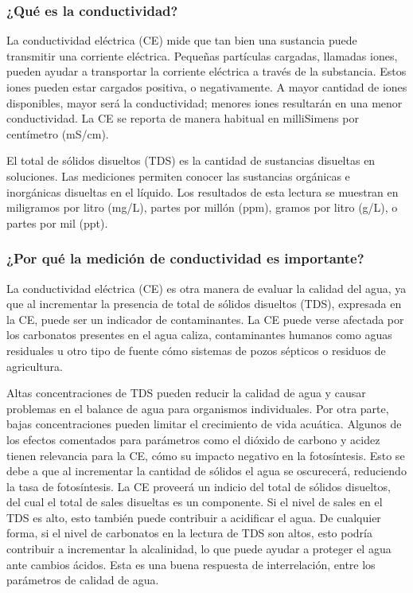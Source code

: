 \subsubsection{¿Qué es la conductividad?}
La conductividad eléctrica (CE) mide que tan bien una sustancia puede transmitir una corriente eléctrica. 
Pequeñas partículas cargadas, llamadas iones, pueden ayudar a transportar la corriente eléctrica a través de la substancia. 
Estos iones pueden estar cargados positiva, o negativamente. A mayor cantidad de iones disponibles, mayor será la conductividad; menores iones resultarán en una menor conductividad. 
La CE se reporta de manera habitual en milliSimens por centímetro (mS/cm).

El total de sólidos disueltos (TDS) es la cantidad de sustancias disueltas en soluciones. 
Las mediciones permiten conocer las sustancias orgánicas e inorgánicas disueltas en el líquido. 
Los resultados de esta lectura se muestran en miligramos por litro (mg/L), partes por mill\'on (ppm), gramos por litro (g/L), o partes por mil (ppt).

\subsubsection{¿Por qu\'e la medici\'on de conductividad es importante?}
La conductividad eléctrica (CE) es otra manera de evaluar la calidad del agua, ya que al incrementar la presencia de total de sólidos disueltos (TDS), expresada en la CE, puede ser un indicador de contaminantes. 
La CE puede verse afectada por los carbonatos presentes en el agua caliza, contaminantes humanos como aguas residuales u otro tipo de fuente cómo sistemas de pozos sépticos o residuos de agricultura.

Altas concentraciones de TDS pueden reducir la calidad de agua y causar problemas en el balance de agua para organismos individuales. 
Por otra parte, bajas concentraciones pueden limitar el crecimiento de vida acuática. 
Algunos de los efectos comentados para parámetros como el dióxido de carbono y acidez tienen relevancia para la CE, cómo su impacto negativo en la fotosíntesis. 
Esto se debe a que al incrementar la cantidad de sólidos el agua se oscurecerá, reduciendo la tasa de fotosíntesis. 
La CE proveerá un indicio del total de sólidos disueltos, del cual el total de sales disueltas es un componente. 
Si el nivel de sales en el TDS es alto, esto también puede contribuir a acidificar el agua. 
De cualquier forma, si el nivel de carbonatos en la lectura de TDS son altos, esto podría contribuir a incrementar la alcalinidad, lo que puede ayudar a proteger el agua ante cambios ácidos. 
Esta es una buena respuesta de interrelación, entre los parámetros de calidad de agua.

